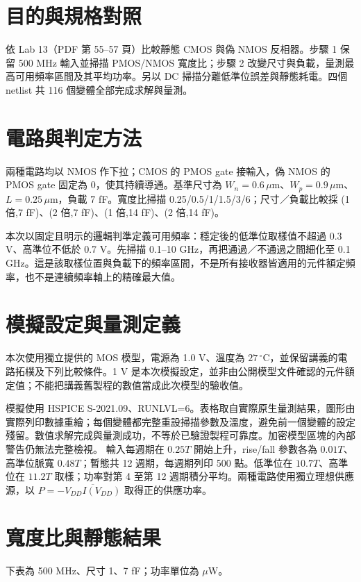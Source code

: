 \section{目的與規格對照}
依 Lab 13（PDF 第 55--57 頁）比較靜態 CMOS 與偽 NMOS 反相器。步驟 1 保留 500 MHz 輸入並掃描 PMOS/NMOS 寬度比；步驟 2 改變尺寸與負載，量測最高可用頻率區間及其平均功率。另以 DC 掃描分離低準位誤差與靜態耗電。四個 netlist 共 116 個變體全部完成求解與量測。

\section{電路與判定方法}
兩種電路均以 NMOS 作下拉；CMOS 的 PMOS gate 接輸入，偽 NMOS 的 PMOS gate 固定為 0，使其持續導通。基準尺寸為 $W_n=0.6\,\mu$m、$W_p=0.9\,\mu$m、$L=0.25\,\mu$m，負載 7 fF。寬度比掃描 0.25/0.5/1/1.5/3/6；尺寸／負載比較採 (1 倍,7 fF)、(2 倍,7 fF)、(1 倍,14 fF)、(2 倍,14 fF)。

本次以固定且明示的邏輯判準定義可用頻率：穩定後的低準位取樣值不超過 0.3 V、高準位不低於 0.7 V。先掃描 0.1--10 GHz，再把通過／不通過之間細化至 0.1 GHz。這是該取樣位置與負載下的頻率區間，不是所有接收器皆適用的元件額定頻率，也不是連續頻率軸上的精確最大值。

\section{模擬設定與量測定義}
本次使用獨立提供的 MOS 模型，電源為 1.0 V、溫度為 $27\,^{\circ}$C，並保留講義的電路拓樸及下列比較條件。1 V 是本次模擬設定，並非由公開模型文件確認的元件額定值；不能把講義舊製程的數值當成此次模型的驗收值。

模擬使用 HSPICE S-2021.09、RUNLVL=6。表格取自實際原生量測結果，圖形由實際列印數據重繪；每個變體都完整重設掃描參數及溫度，避免前一個變體的設定殘留。數值求解完成與量測成功，不等於已驗證製程可靠度。加密模型區塊的內部警告仍無法完整檢視。
輸入每週期在 $0.25T$ 開始上升，rise/fall 參數各為 $0.01T$、高準位脈寬 $0.48T$；暫態共 12 週期，每週期列印 500 點。低準位在 $10.7T$、高準位在 $11.2T$ 取樣；功率對第 4 至第 12 週期積分平均。兩種電路使用獨立理想供應源，以 $P=-\overline{V_{DD}I(V_{DD})}$ 取得正的供應功率。

\section{寬度比與靜態結果}
下表為 500 MHz、尺寸 1、7 fF；功率單位為 $\mu$W。

